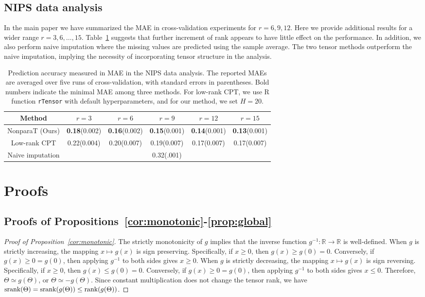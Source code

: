 \documentclass[11pt]{article}
\theoremstyle{plain}
\theoremstyle{definition}
\def\srank{\textup{srank}}
\def\rank{\textup{rank}}
\begin{document}
\subsection{NIPS data analysis}
In the main paper we have summarized the MAE in cross-validation experiments for $r=6, 9,12$. Here we provide additional results for a wider range $r= 3, 6, \ldots,15$. Table~\ref{tab:NIPS} suggests that further increment of rank appears to have little effect on the performance. In addition, we also perform naive imputation where the missing values are predicted using the sample average. The two tensor methods outperform the naive imputation, implying the necessity of incorporating tensor structure in the analysis.
\begin{table}[h!]
\centering
\begin{tabular}{c|ccccc}
Method & $r = 3$ & $r = 6$ & $r=9$ & $r=12$&$r=15$ \\
\hline
NonparaT (Ours) & {\bf 0.18}(0.002) & {\bf 0.16}(0.002) & {\bf 0.15}(0.001)& {\bf 0.14}(0.001)&{\bf 0.13}(0.001)\\
 \hline
Low-rank CPT &0.22(0.004) & 0.20(0.007) & 0.19(0.007)&0.17(0.007)&0.17(0.007)\\
  \hline
Naive imputation& \multicolumn{5}{c}{0.32(.001)}\\
\end{tabular}
\caption{Prediction accuracy measured in MAE in the NIPS data analysis. The reported MAEs are averaged over five runs of cross-validation, with standard errors in parentheses. Bold numbers indicate the minimal MAE among three methods. For low-rank CPT, we use R function {\tt rTensor} with default hyperparameters, and for our method, we set $H=20$. }\label{tab:NIPS}
\end{table}

\section{Proofs}\label{sec:proof}
\subsection{Proofs of Propositions~\ref{cor:monotonic}-\ref{prop:global}}
\begin{proof}[Proof of Proposition~\ref{cor:monotonic}]
The strictly monotonicity of $g$ implies that the inverse function $g^{-1}\colon \mathbb{R}\to \mathbb{R}$ is well-defined. 
When $g$ is strictly increasing, the mapping $x\mapsto g(x)$ is sign preserving. Specifically, if $x\geq 0$, then $g(x)\geq g(0)=0$. Conversely, if $g(x)\geq 0=g(0)$, then applying $g^{-1}$ to both sides gives $x\geq 0$.
When $g$ is strictly decreasing, the mapping $x\mapsto g(x)$ is sign reversing. Specifically, if $x\geq 0$, then $g(x)\leq g(0)=0$. Conversely, if $g(x)\geq 0=g(0)$, then applying $g^{-1}$ to both sides gives $x\leq 0$.
 Therefore, $\Theta\simeq g(\Theta)$,  or $\Theta\simeq -g(\Theta)$. Since constant multiplication  does not change the tensor rank,  we have $\srank(\Theta)=\srank(g(\Theta))\leq \rank (g(\Theta))$. 
\end{proof}
\end{document}
